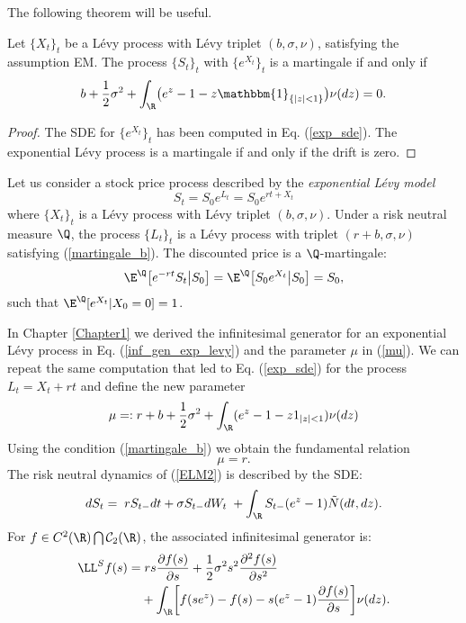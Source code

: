 The following theorem will be useful.
\begin{Theorem}
 Let $\{X_t\}_t$ be a Lévy process with Lévy triplet $(b,\sigma,\nu)$, satisfying the assumption EM. The process $\{S_t\}_t$ with $\{e^{X_t}\}_t$ is a martingale if and only if
 \begin{equation}\label{martingale_b}
  b +\frac{1}{2} \sigma^2  + \int_{\R} \bigl( e^z-1 -z\mathbbm{1}_{\{ |z|<1 \}} \bigr) \nu(dz) = 0.
 \end{equation}
\end{Theorem}
\begin{proof}
 The SDE for $\{e^{X_t}\}_t$ has been computed in Eq. (\ref{exp_sde}). The exponential Lévy process is a martingale if and only if the drift is zero.
\end{proof}
Let us consider a stock price process described by the \emph{exponential Lévy model}
\begin{equation}\label{ELM2}
 S_t = S_0 e^{L_t} = S_0 e^{rt + X_t}
\end{equation}
where $\{X_t\}_t$ is a Lévy process with Lévy triplet $(b,\sigma,\nu)$. Under a risk neutral measure $\Q$, the process $\{L_t\}_t$ is a Lévy process with triplet $(r+b,\sigma,\nu)$ 
satisfying (\ref{martingale_b}).  
The discounted price is a $\Q$-martingale:
\begin{equation}
 \E^{\Q} \bigl[ e^{-rt} S_t \bigr| S_0 \bigr] =  \E^{\Q} \bigl[ S_0e^{X_t} \bigr| S_0 \bigr] = S_0, 
\end{equation}
such that $\E^{\Q}[ e^{X_t} | X_0=0] = 1 $. 

In Chapter \ref{Chapter1} we derived the infinitesimal generator for an exponential Lévy process in Eq. (\ref{inf_gen_exp_levy}) and the 
parameter $\mu$ in (\ref{mu}).
We can repeat the same computation that led to Eq. (\ref{exp_sde}) for the process $L_t = X_t + rt$ and define the new parameter
\begin{equation}\label{mu2}
 \mu =: r + b + \frac{1}{2}\sigma^2 + \int_{\R} ( e^{z} - 1 -z1_{|z|<1}) \nu(dz)
\end{equation}
Using the condition (\ref{martingale_b}) we obtain the fundamental relation
\begin{equation}\label{mu=r}
 \mu = r.
\end{equation}
The risk neutral dynamics of (\ref{ELM2}) is described by the SDE:
\begin{equation}\label{RN_sde}
 d S_t = \; r S_{t-} dt +  \sigma S_{t-} dW_t \; + \int_{\R} S_{t-} (e^{z} - 1) \tilde N(dt,dz). 
\end{equation}
For $f \in C^{2}(\R) \bigcap \mathcal{C}_2(\R)$, the associated infinitesimal generator is:
\begin{align}\label{RN_inf_gen}
 \LL^S f(s) =& \; r s \frac{\partial f(s)}{\partial s}
+ \frac{1}{2} \sigma^2 s^2 \frac{\partial^2  f(s)}{\partial s^2}  \\ \nonumber
&+ \int_{\R} \biggl[ f(se^z) - f(s) - s(e^z-1)\frac{\partial f(s)}{\partial s} \biggr] \nu(dz).
\end{align}

